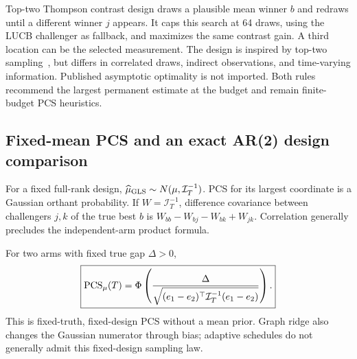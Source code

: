 Top-two Thompson contrast design draws a plausible mean winner $b$ and redraws until a different winner $j$ appears. It caps this search at 64 draws, using the LUCB challenger as fallback, and maximizes the same contrast gain. A third location can be the selected measurement. The design is inspired by top-two sampling~\cite{collected9}, but differs in correlated draws, indirect observations, and time-varying information. Published asymptotic optimality is not imported. Both rules recommend the largest permanent estimate at the budget and remain finite-budget PCS heuristics.



\subsection{Fixed-mean PCS and an exact AR(2) design comparison}
For a fixed full-rank design, $\widehat\mu_{\rm GLS}\sim N(\mu,\mathcal I_T^{-1})$. PCS for its largest coordinate is a Gaussian orthant probability. If $W=\mathcal I_T^{-1}$, difference covariance between challengers $j,k$ of the true best $b$ is $W_{bb}-W_{bj}-W_{bk}+W_{jk}$. Correlation generally precludes the independent-arm product formula.

For two arms with fixed true gap $\Delta>0$,
\begin{equation}
\boxed{\operatorname{PCS}_\mu(T)=\Phi\left(
\frac{\Delta}{\sqrt{(e_1-e_2)^\top\mathcal I_T^{-1}(e_1-e_2)}}\right).}
\label{spatiotemporal_bandits:eq:fixed-pcs}
\end{equation}
This is fixed-truth, fixed-design PCS without a mean prior. Graph ridge also changes the Gaussian numerator through bias; adaptive schedules do not generally admit this fixed-design sampling law.


